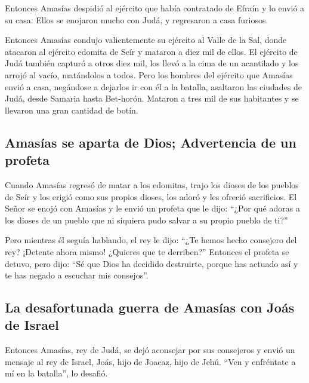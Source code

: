  Entonces Amasías despidió al ejército que había
contratado de Efraín y lo envió a su casa. Ellos se enojaron mucho con
Judá, y regresaron a casa furiosos.

 Entonces Amasías condujo valientemente su ejército al
Valle de la Sal, donde atacaron al ejército edomita de Seír y mataron a
diez mil de ellos.  El ejército de Judá también capturó a
otros diez mil, los llevó a la cima de un acantilado y los arrojó al
vacío, matándolos a todos.  Pero los hombres del ejército
que Amasías envió a casa, negándose a dejarlos ir con él a la batalla,
asaltaron las ciudades de Judá, desde Samaria hasta Bet-horón. Mataron a
tres mil de sus habitantes y se llevaron una gran cantidad de botín.

\hypertarget{amasuxedas-se-aparta-de-dios-advertencia-de-un-profeta}{%
\subsection{Amasías se aparta de Dios; Advertencia de un
profeta}\label{amasuxedas-se-aparta-de-dios-advertencia-de-un-profeta}}

 Cuando Amasías regresó de matar a los edomitas, trajo
los dioses de los pueblos de Seír y los erigió como sus propios dioses,
los adoró y les ofreció sacrificios.  El Señor se enojó
con Amasías y le envió un profeta que le dijo: ``¿Por qué adoras a los
dioses de un pueblo que ni siquiera pudo salvar a su propio pueblo de
ti?''

 Pero mientras él seguía hablando, el rey le dijo: ``¿Te
hemos hecho consejero del rey? ¡Detente ahora mismo! ¿Quieres que te
derriben?'' Entonces el profeta se detuvo, pero dijo: ``Sé que Dios ha
decidido destruirte, porque has actuado así y te has negado a escuchar
mis consejos''.

\hypertarget{la-desafortunada-guerra-de-amasuxedas-con-jouxe1s-de-israel}{%
\subsection{La desafortunada guerra de Amasías con Joás de
Israel}\label{la-desafortunada-guerra-de-amasuxedas-con-jouxe1s-de-israel}}

 Entonces Amasías, rey de Judá, se dejó aconsejar por sus
consejeros y envió un mensaje al rey de Israel, Joás, hijo de Joacaz,
hijo de Jehú. ``Ven y enfréntate a mí en la batalla'', lo desafió.

